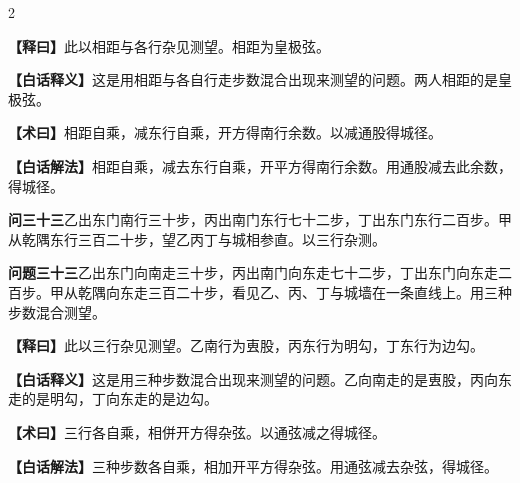 \documentclass[11pt,a4paper]{article}
\newcommand{\WenQuestion}[1]{\textbf{\textcolor{classicalcolor}{#1}}}
\newcommand{\BaiQuestion}[1]{\textbf{\textcolor{moderncolor}{#1}}}
\newcommand{\WenExplain}{\textcolor{classicalcolor}{\textbf{【释曰】}}}
\newcommand{\BaiExplain}{\textcolor{moderncolor}{\textbf{【白话释义】}}}
\newcommand{\WenMethod}{\textcolor{classicalcolor}{\textbf{【术曰】}}}
\newcommand{\BaiMethod}{\textcolor{moderncolor}{\textbf{【白话解法】}}}
\begin{document}
\begin{paracol}{2}
\switchcolumn*
\begin{tcolorbox}[colback=red!5,colframe=red!30!black,boxrule=0.3pt]
\WenExplain\quad 此以相距与各行杂见测望。相距为皇极弦。
\end{tcolorbox}
\switchcolumn
\begin{tcolorbox}[colback=blue!5,colframe=blue!30!black,boxrule=0.3pt]
\BaiExplain\quad 这是用相距与各自行走步数混合出现来测望的问题。两人相距的是皇极弦。
\end{tcolorbox}

\switchcolumn*
\begin{tcolorbox}[colback=red!5,colframe=red!40!black,boxrule=0.3pt]
\WenMethod\quad 相距自乘，减东行自乘，开方得南行余数。以减通股得城径。
\end{tcolorbox}
\switchcolumn
\begin{tcolorbox}[colback=blue!5,colframe=blue!40!black,boxrule=0.3pt]
\BaiMethod\quad 相距自乘，减去东行自乘，开平方得南行余数。用通股减去此余数，得城径。
\end{tcolorbox}

\vspace{0.8em}

\switchcolumn*
\begin{tcolorbox}[colback=red!3,colframe=red!30!black,boxrule=0.3pt]
\WenQuestion{问三十三}\quad 乙出东门南行三十步，丙出南门东行七十二步，丁出东门东行二百步。甲从乾隅东行三百二十步，望乙丙丁与城相参直。以三行杂测。
\end{tcolorbox}
\switchcolumn
\begin{tcolorbox}[colback=blue!3,colframe=blue!30!black,boxrule=0.3pt]
\BaiQuestion{问题三十三}\quad 乙出东门向南走三十步，丙出南门向东走七十二步，丁出东门向东走二百步。甲从乾隅向东走三百二十步，看见乙、丙、丁与城墙在一条直线上。用三种步数混合测望。
\end{tcolorbox}

\switchcolumn*
\begin{tcolorbox}[colback=red!5,colframe=red!30!black,boxrule=0.3pt]
\WenExplain\quad 此以三行杂见测望。乙南行为叀股，丙东行为明勾，丁东行为边勾。
\end{tcolorbox}
\switchcolumn
\begin{tcolorbox}[colback=blue!5,colframe=blue!30!black,boxrule=0.3pt]
\BaiExplain\quad 这是用三种步数混合出现来测望的问题。乙向南走的是叀股，丙向东走的是明勾，丁向东走的是边勾。
\end{tcolorbox}

\switchcolumn*
\begin{tcolorbox}[colback=red!5,colframe=red!40!black,boxrule=0.3pt]
\WenMethod\quad 三行各自乘，相併开方得杂弦。以通弦减之得城径。
\end{tcolorbox}
\switchcolumn
\begin{tcolorbox}[colback=blue!5,colframe=blue!40!black,boxrule=0.3pt]
\BaiMethod\quad 三种步数各自乘，相加开平方得杂弦。用通弦减去杂弦，得城径。
\end{tcolorbox}


\end{paracol}
\end{document}
